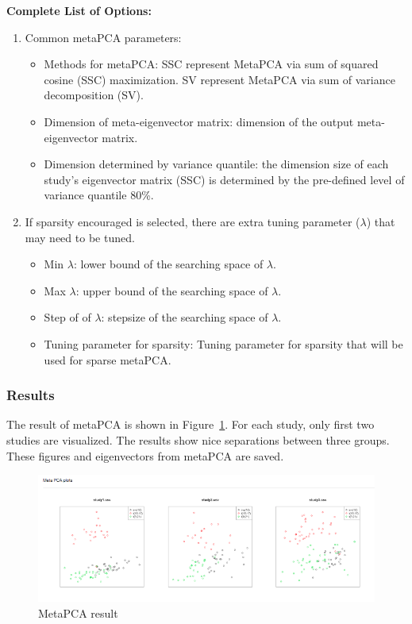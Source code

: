 \textbf{Complete List of Options:} 
\begin{enumerate}
\item Common metaPCA parameters: 

\begin{itemize}
\item Methods for metaPCA:
SSC represent MetaPCA via sum of squared cosine (SSC) maximization.
SV represent MetaPCA via sum of variance decomposition (SV).
\item Dimension of meta-eigenvector matrix: dimension of the output meta-eigenvector matrix.
\item Dimension determined by variance quantile:
the dimension size of each study's eigenvector matrix (SSC) is determined  by the pre-defined level of variance quantile 80\%.
\end{itemize}

\item If sparsity encouraged is selected, there are extra tuning parameter ($\lambda$) that may need to be tuned.

\begin{itemize}
\item  Min $\lambda$: lower bound of the searching space of $\lambda$.
\item Max $\lambda$: upper bound of the searching space of $\lambda$.
\item Step of of $\lambda$: stepsize of the searching space of $\lambda$.
\item Tuning parameter for sparsity: Tuning parameter for sparsity that will be used for sparse metaPCA.
\end{itemize}


\end{enumerate}


\subsubsection{Results}
The result of metaPCA is shown in Figure~\ref{fig:metaPCAresult}.
For each study, only first two studies are visualized.
The results show nice separations between three groups.
These figures and eigenvectors from metaPCA are saved.

\begin{figure}[H]
\begin{center}
\includegraphics[scale=0.4]{./figure/metaPCA/metaPCA}
\caption{MetaPCA result}
\label{fig:metaPCAresult}
\end{center}
\end{figure}

